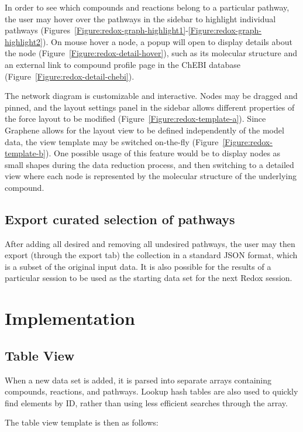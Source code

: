 In order to see which compounds and reactions belong to a particular pathway, the user may hover over the pathways in the sidebar to highlight individual pathways (Figures~\ref{Figure:redox-graph-highlight1}-\ref{Figure:redox-graph-highlight2}).
On mouse hover a node, a popup will open to display details about the node (Figure~\ref{Figure:redox-detail-hover}), such as its molecular structure and an external link to compound profile page in the ChEBI database (Figure~\ref{Figure:redox-detail-chebi}).

The network diagram is customizable and interactive.
Nodes may be dragged and pinned, and the layout settings panel in the sidebar allows different properties of the force layout to be modified (Figure~\ref{Figure:redox-template-a}).
Since Graphene allows for the layout view to be defined independently of the model data, the view template may be switched on-the-fly (Figure~\ref{Figure:redox-template-b}).
One possible usage of this feature would be to display nodes as small shapes during the data reduction process, and then switching to a detailed view where each node is represented by the molecular structure of the underlying compound.

\subsection{Export curated selection of pathways}

After adding all desired and removing all undesired pathways, the user may then export (through the export tab) the collection in a standard JSON format, which is a subset of the original input data.
It is also possible for the results of a particular session to be used as the starting data set for the next Redox session.

\section{Implementation}

\subsection{Table View}
When a new data set is added, it is parsed into separate arrays containing compounds, reactions, and pathways.
Lookup hash tables are also used to quickly find elements by ID, rather than using less efficient searches through the array.

The table view template is then as follows:

